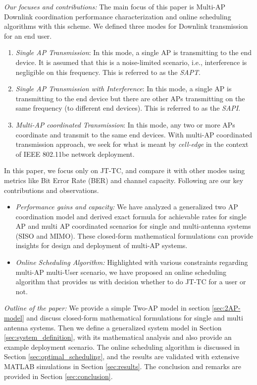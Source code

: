 \noindent\textit{Our focuses and contributions:} The main focus of this paper is Multi-AP Downlink coordination performance characterization and online scheduling algorithms with this scheme.
We defined three modes for Downlink transmission for an end user.
\begin{enumerate}
    \item \textit{Single AP Transmission}: In this mode, a single AP is transmitting to the end device. It is assumed that this is a noise-limited scenario, i.e., interference is negligible on this frequency. This is referred to as the \textit{SAPT}.
    
    \item \textit{Single AP Transmission with Interference}: In this mode, a single AP is transmitting to the end device but there are other APs transmitting on the same frequency (to different end devices). This is referred to as the \textit{SAPI}.
    
    \item \textit{Multi-AP coordinated Transmission}: In this mode, any two or more APs coordinate and transmit to the same end devices. With multi-AP coordinated transmission approach, we seek for what is meant by \emph{cell-edge} in the context of IEEE 802.11be network deployment.
\end{enumerate}
In this paper, we focus only on JT-TC, and compare it with other modes using metrics like Bit Error Rate (BER) and channel capacity.
Following are our key contributions and observations.
\begin{itemize}
    \item \textit{Performance gains and capacity:}  We have analyzed a generalized two AP coordination model and derived exact formula for achievable rates for single AP and multi AP coordinated scenarios for single and multi-antenna systems (SISO and MIMO). These closed-form mathematical formulations can provide insights for design and deployment of multi-AP systems.
    
    \item \textit{Online Scheduling Algorithm:} Highlighted  with various constraints regarding multi-AP multi-User scenario, we have proposed an online scheduling algorithm that provides us with decision whether to do JT-TC for a user or not.
\end{itemize}

\noindent\textit{Outline of the paper:} We provide a simple Two-AP model in section \ref{sec:2AP-model} and discuss closed-form mathematical formulations for single and multi antenna systems. Then we define a generalized system model in Section \ref{sec:system_definition}, with its mathematical analysis and also provide an example deployment scenario. The online scheduling algorithm is discussed in Section \ref{sec:optimal_scheduling}, and the results are validated with extensive MATLAB simulations in Section \ref{sec:results}. The conclusion and remarks are provided in Section \ref{sec:conclusion}.


